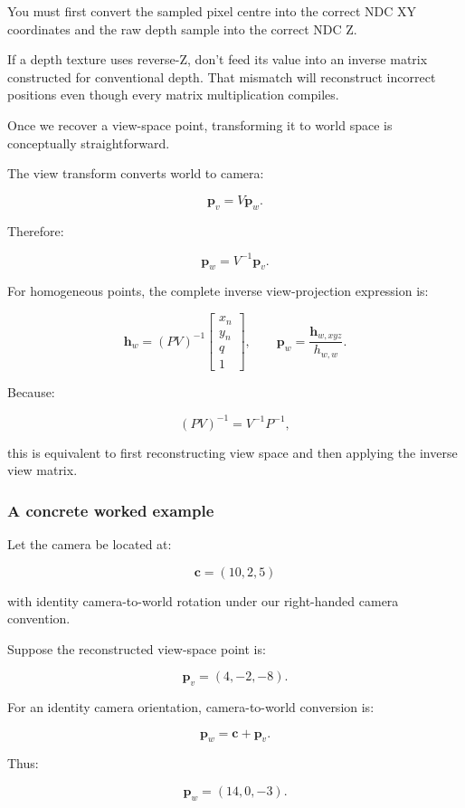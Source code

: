 You must first convert the sampled pixel centre into the correct NDC XY coordinates and the raw depth sample into the correct NDC Z.

If a depth texture uses reverse-Z, don't feed its value into an inverse matrix constructed for conventional depth. That mismatch will reconstruct incorrect positions even though every matrix multiplication compiles.

Once we recover a view-space point, transforming it to world space is conceptually straightforward.

The view transform converts world to camera:

\[ \mathbf p_v=V\mathbf p_w. \]

Therefore:

\[ \boxed{ \mathbf p_w=V^{-1}\mathbf p_v. } \]

For homogeneous points, the complete inverse view-projection expression is:

\[ \boxed{ \mathbf h_w=(PV)^{-1} \begin{bmatrix} x_n\\y_n\\q\\1 \end{bmatrix}, \qquad \mathbf p_w=\frac{\mathbf h_{w,xyz}}{h_{w,w}}. } \]

Because:

\[ (PV)^{-1}=V^{-1}P^{-1}, \]

this is equivalent to first reconstructing view space and then applying the inverse view matrix.

\subsubsection{A concrete worked example}\label{a-concrete-worked-example}

Let the camera be located at:

\[ \mathbf c=(10,2,5) \]

with identity camera-to-world rotation under our right-handed camera convention.

Suppose the reconstructed view-space point is:

\[ \mathbf p_v=(4,-2,-8). \]

For an identity camera orientation, camera-to-world conversion is:

\[ \mathbf p_w=\mathbf c+\mathbf p_v. \]

Thus:

\[ \boxed{ \mathbf p_w=(14,0,-3). } \]

